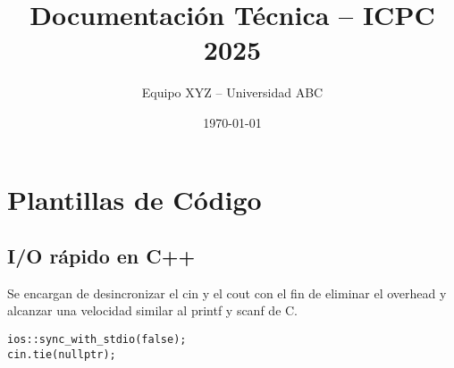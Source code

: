 \documentclass[11pt,a4paper]{article}
\title{Documentación Técnica – ICPC 2025}
\author{Equipo XYZ – Universidad ABC}
\date{\today}
\begin{document}
\maketitle
\tableofcontents
\newpage

\section{Plantillas de Código}

\subsection{I/O rápido en C++}
Se encargan de desincronizar el cin y el cout con el fin de eliminar el overhead y alcanzar una velocidad similar al printf y scanf de C.
\begin{lstlisting}
ios::sync_with_stdio(false);
cin.tie(nullptr);
\end{lstlisting}
\end{document}
